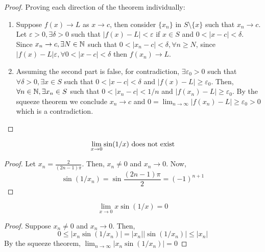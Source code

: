 \begin{proof}
    Proving each direction of the theorem individually:
    \begin{enumerate}
        \item Suppose $f(x) \to L$ as $x \to c$, then consider $\{x_n\}$ in $S \setminus \{x\}$ such that $x_n \to c$. Let $\varepsilon > 0, \exists \delta > 0$ such that $|f(x) - L| < \varepsilon$ if $x \in S$ and $0 < |x-c| < \delta$. Since $x_n \to c, \exists N \in \mathbb{N}$ such that $0 < |x_n-c| < \delta, \forall n \geq N$, since $|f(x) - L| \varepsilon, \forall 0 < |x-c| < \delta$ then $f(x_n) \to L$.
        \item Assuming the second part is false, for contradiction, $\exists \varepsilon_0 > 0$ such that $\forall \delta > 0, \exists x \in S$ such that $0 < |x-c| < \delta$ and $|f(x) - L| \geq \varepsilon_0$. Then, $\forall n \in \mathbb{N}, \exists x_n \in S$ such that $0 < |x_n - c| < 1/n$ and $|f(x_n) - L| \geq \varepsilon_0$. By the squeeze theorem we conclude $x_n \to c$ and $0 = \lim_{n \to \infty} |f(x_n) - L| \geq \varepsilon_0 > 0$ which is a contradiction.
    \end{enumerate}
\end{proof}

\begin{theorem}
    \begin{equation*}
        \lim \limits_{x \to 0} \sin (1/x) \textnormal { does not exist}
    \end{equation*}
\end{theorem}

\begin{proof}
    Let $x_n = \frac{2}{(2n-1)\pi}$. Then, $x_n \neq 0$ and $x_n \to 0$. Now,
    \begin{equation*}
        \sin (1/x_n) = \sin \frac{(2n-1) \pi}{2} = (-1)^{n+1}
    \end{equation*}
\end{proof}

\begin{theorem}
    \begin{equation*}
        \lim \limits_{x \to 0} x \sin(1/x) = 0
    \end{equation*}
\end{theorem}

\begin{proof}
    Suppose $x_n \neq 0$ and $x_n \to 0$. Then,
    \begin{equation*}
        0 \leq |x_n \sin(1/x_n)| = |x_n||\sin(1/x_n)| \leq |x_n|
    \end{equation*}
    By the squeeze theorem, $\lim _{n \to \infty} |x_n \sin(1/x_n)| = 0$
\end{proof}

